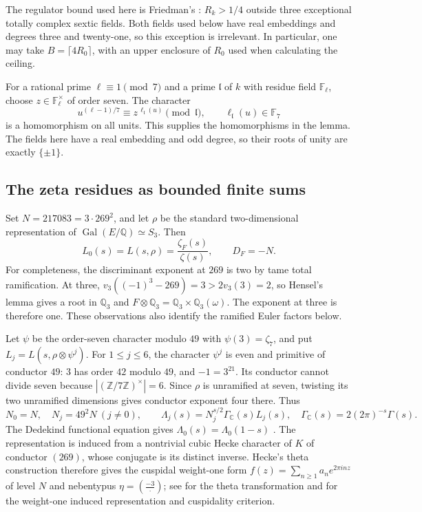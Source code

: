 \documentclass[11pt]{article}
\begin{document}
The regulator bound used here is Friedman's
\cite[Theorem~B, pp.~599--600]{sevenFriedman1989}: $R_k>1/4$ outside three
exceptional totally complex sextic fields. Both fields used below have real
embeddings and degrees three and twenty-one, so this exception is irrelevant.
In particular, one may take $B=\lceil4R_0\rceil$, with an upper enclosure of
$R_0$ used when calculating the ceiling.

For a rational prime $\ell\equiv1\pmod7$ and a prime
$\mathfrak l$ of $k$ with residue field $\mathbb F_\ell$, choose
$z\in\mathbb F_\ell^\times$ of order seven. The character
\[
 u^{(\ell-1)/7}\equiv z^{\,\ell_{\mathfrak l}(u)}
 \pmod{\mathfrak l},\qquad
 \ell_{\mathfrak l}(u)\in\mathbb F_7
 \tag{S6}\label{seven:residue-character}
\]
is a homomorphism on all units. This supplies the homomorphisms in the lemma.
The fields here have a real embedding and odd degree, so their roots of
unity are exactly $\{\pm1\}$.

\subsection{The zeta residues as bounded finite sums}
\label{seven:analytic}

Set $N=217083=3\cdot269^2$, and let $\rho$ be the standard two-dimensional
representation of $\operatorname{Gal}(E/\mathbb Q)\simeq S_3$. Then
\[
 L_0(s)=L(s,\rho)=\frac{\zeta_F(s)}{\zeta(s)},\qquad
 D_F=-N.
 \tag{S7}\label{seven:base-L}
\]
For completeness, the discriminant exponent at $269$ is two by tame total
ramification. At three, $v_3((-1)^3-269)=3>2v_3(3)=2$, so Hensel's
lemma gives a root in $\mathbb Q_3$ and
$F\otimes\mathbb Q_3=\mathbb Q_3\times\mathbb Q_3(\omega)$.
The exponent at three is therefore one. These observations also identify
the ramified Euler factors below.

Let $\psi$ be the order-seven character modulo $49$ with
$\psi(3)=\zeta_7$, and put $L_j=L(s,\rho\otimes\psi^j)$.
For $1\le j\le6$, the character $\psi^j$ is even and primitive of conductor
$49$: $3$ has order $42$ modulo $49$, and $-1=3^{21}$.
Its conductor cannot divide seven because
$|(\mathbb Z/7\mathbb Z)^\times|=6$.
Since $\rho$ is unramified at seven, twisting its two unramified dimensions
gives conductor exponent four there. Thus
\[
 N_0=N,\quad N_j=49^2N\ (j\ne0),\qquad
 \Lambda_j(s)=N_j^{s/2}\Gamma_{\mathbb C}(s)L_j(s),
 \quad
 \Gamma_{\mathbb C}(s)=2(2\pi)^{-s}\Gamma(s).
 \tag{S8}\label{seven:conductors}
\]
The Dedekind functional equation gives
$\Lambda_0(s)=\Lambda_0(1-s)$
\cite[Remark~18.14]{sevenSutherland2015}.
The representation is induced from a nontrivial cubic Hecke character of
$K$ of conductor $(269)$, whose conjugate is its distinct inverse.
Hecke's theta construction therefore gives the cuspidal weight-one form
$f(z)=\sum_{n\ge1}a_ne^{2\pi inz}$ of level $N$ and nebentypus
$\eta=\left(\frac{-3}{\,\cdot\,}\right)$; see
\cite[Theorem~5]{sevenSimard2015} for the theta transformation and
\cite[\S3]{sevenDarmonLauderRotger2015} for the weight-one induced
representation and cuspidality criterion.
\end{document}
